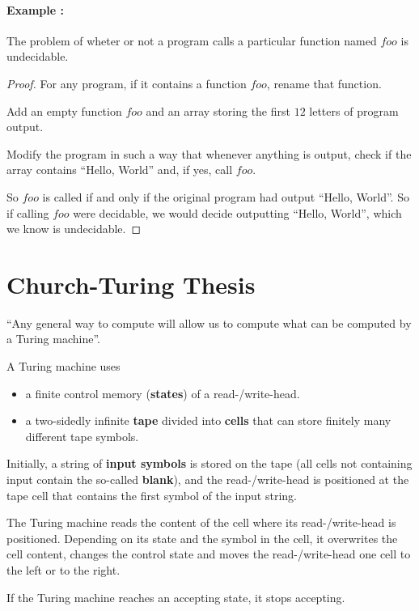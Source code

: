 \documentclass[a4paper,11pt]{report}
\begin{document}
\paragraph{Example :} The problem of wheter or not a program calls a particular
function named $foo$ is undecidable.

\begin{proof}
  For any program, if it contains a function $foo$, rename that function.

  Add an empty function $foo$ and an array storing the first $12$ letters of
  program output.

  Modify the program in such a way that whenever anything is output, check if
  the array contains ``Hello, World'' and, if yes, call $foo$.

So $foo$ is called if and only if the original program had output ``Hello,
World''. So if calling $foo$ were decidable, we would decide outputting ``Hello,
World'', which we know is undecidable.
\end{proof}

\section{Church-Turing Thesis}

``Any general way to compute will allow us to compute what can be computed by a
Turing machine''.

A Turing machine uses
\begin{itemize}
\item a finite control memory (\textbf{states}) of a read-/write-head.
\item a two-sidedly infinite \textbf{tape} divided into \textbf{cells} that can
  store finitely many different tape symbols.
\end{itemize}

Initially, a string of \textbf{input symbols} is stored on the tape (all cells
not containing input contain the so-called \textbf{blank}), and the
read-/write-head is positioned at the tape cell that contains the first symbol
of the input string.

The Turing machine reads the content of the cell where its
read-/write-head is positioned. Depending on its state and the
symbol in the cell, it overwrites the cell content, changes the
control state and moves the read-/write-head one cell to the left or
to the right.

If the Turing machine reaches an accepting state, it stops
accepting.
\end{document}

